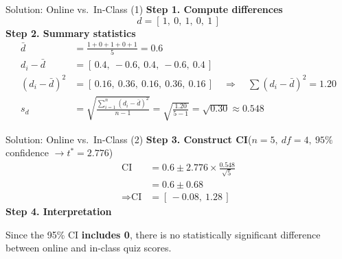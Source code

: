\documentclass[aspectratio=169,11pt]{beamer}
\begin{document}
\begin{frame}{Solution: Online vs.\ In-Class (1)}
  \small
  \textbf{\color{qrnavy}Step 1. Compute differences}
  \begin{equation*}
    d = [\,1,\ 0,\ 1,\ 0,\ 1\,]
  \end{equation*}
  \textbf{\color{qrnavy}Step 2. Summary statistics}
  \begin{align*}
    \bar{d} &= \frac{1+0+1+0+1}{5} = 0.6\\[0.4em]
    d_i - \bar{d} &= [\,0.4,\ -0.6,\ 0.4,\ -0.6,\ 0.4\,]\\
    (d_i - \bar{d})^2 &= [\,0.16,\ 0.36,\ 0.16,\ 0.36,\ 0.16\,]
        \quad\Rightarrow\quad \textstyle\sum (d_i-\bar{d})^2 = 1.20\\[0.4em]
    s_d &= \sqrt{\frac{\sum_{i=1}^{n}(d_i-\bar{d})^2}{n-1}}
         = \sqrt{\frac{1.20}{5-1}} = \sqrt{0.30} \approx 0.548
  \end{align*}
\end{frame}

\begin{frame}{Solution: Online vs.\ In-Class (2)}
  \small
  \textbf{\color{qrnavy}Step 3. Construct CI}\quad ($n = 5,\ df = 4,\ 95\%$ confidence $\rightarrow t^* = 2.776$)
  \begin{align*}
    \text{CI} &= 0.6 \pm 2.776 \times \frac{0.548}{\sqrt{5}}\\
              &= 0.6 \pm 0.68\\
    \Rightarrow \text{CI} &= [\,-0.08,\ 1.28\,]
  \end{align*}
  \vspace{0.2em}
  \textbf{\color{qrnavy}Step 4. Interpretation}
  \begin{tcolorbox}[colback=qrlight,colframe=qrred,arc=2pt,boxrule=0.6pt]
    Since the 95\% CI \textbf{includes 0}, there is no statistically significant
    difference between online and in-class quiz scores.
  \end{tcolorbox}
\end{frame}
\end{document}
